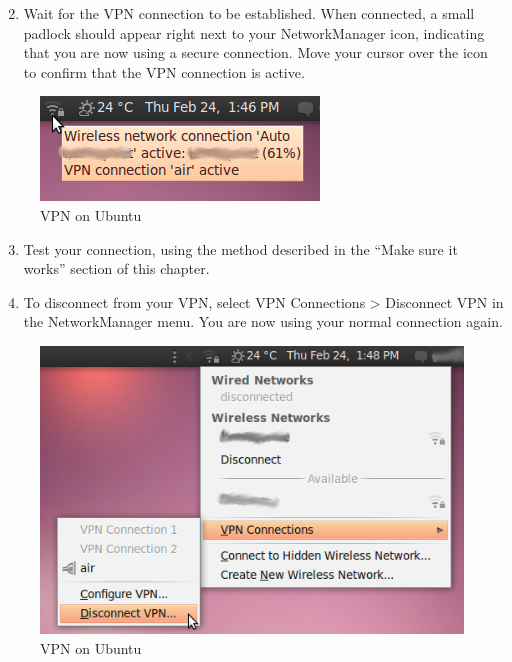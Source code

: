 \begin{enumerate}[1.]
\setcounter{enumi}{1}
\item
  Wait for the VPN connection to be established. When connected, a small
  padlock should appear right next to your NetworkManager icon,
  indicating that you are now using a secure connection. Move your
  cursor over the icon to confirm that the VPN connection is active.
\end{enumerate}
\begin{figure}[htbp]
\centering
\includegraphics{vpn_ubuntu_015.png}
\caption{VPN on Ubuntu}
\end{figure}

\begin{enumerate}[1.]
\setcounter{enumi}{2}
\item
  Test your connection, using the method described in the ``Make sure it
  works'' section of this chapter.
\item
  To disconnect from your VPN, select VPN Connections \textgreater{}
  Disconnect VPN in the NetworkManager menu. You are now using your
  normal connection again.
\end{enumerate}
\begin{figure}[htbp]
\centering
\includegraphics{vpn_ubuntu_016.png}
\caption{VPN on Ubuntu}
\end{figure}


